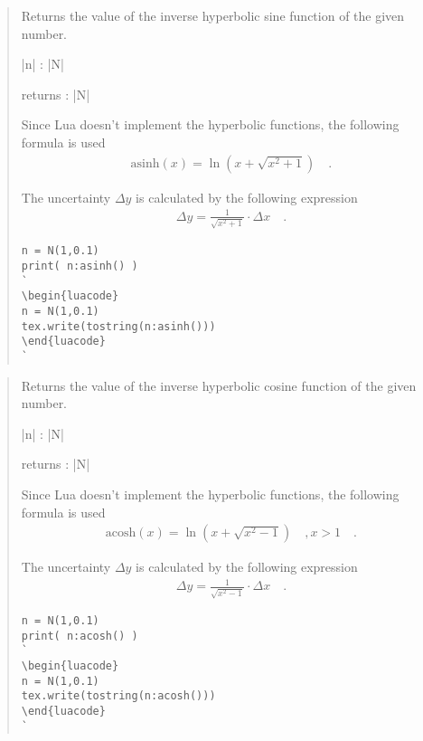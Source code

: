 \documentclass{ltxdoc}
\begin{document}
\begin{quote}
  Returns the value of the inverse hyperbolic sine function of the given number.

  \begin{description}
  \item |n| : |N|

  \item returns : |N|
  \end{description}

  Since Lua doesn't implement the hyperbolic functions, the following formula is used
  \begin{align*}
    \text{asinh}(x) = \ln\left( x + \sqrt{x^2 + 1} \right)  \quad.
  \end{align*}

  The uncertainty $\Delta y$ is calculated by the following expression
  \begin{align*}
    \Delta y = \frac{1}{\sqrt{x^2 + 1}} \cdot \Delta x \quad.
  \end{align*}


\begin{lstlisting}
n = N(1,0.1)
print( n:asinh() )
`
\begin{luacode}
n = N(1,0.1)
tex.write(tostring(n:asinh()))
\end{luacode}
`
\end{lstlisting}

\end{quote}



\begin{quote}
  Returns the value of the inverse hyperbolic cosine function of the given number.

  \begin{description}
  \item |n| : |N|

  \item returns : |N|
  \end{description}

  Since Lua doesn't implement the hyperbolic functions, the following formula is used
  \begin{align*}
    \text{acosh}(x) = \ln\left( x + \sqrt{x^2 - 1} \right)  \quad, x > 1 \quad.
  \end{align*}

  The uncertainty $\Delta y$ is calculated by the following expression
  \begin{align*}
    \Delta y = \frac{1}{\sqrt{x^2 - 1}} \cdot \Delta x \quad.
  \end{align*}




\begin{lstlisting}
n = N(1,0.1)
print( n:acosh() )
`
\begin{luacode}
n = N(1,0.1)
tex.write(tostring(n:acosh()))
\end{luacode}
`
\end{lstlisting}

\end{quote}
\end{document}
